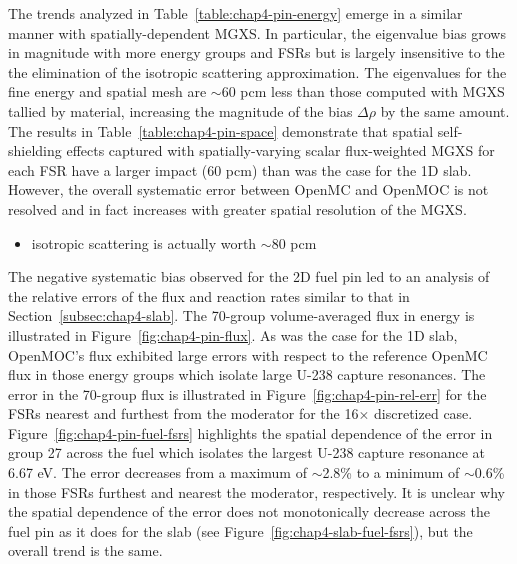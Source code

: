 The trends analyzed in Table~\ref{table:chap4-pin-energy} emerge in a similar manner with spatially-dependent \ac{MGXS}. In particular, the eigenvalue bias grows in magnitude with more energy groups and \ac{FSR}s but is largely insensitive to the the elimination of the isotropic scattering approximation. The eigenvalues for the fine energy and spatial mesh are $\sim$60 pcm less than those computed with \ac{MGXS} tallied by material, increasing the magnitude of the bias $\Delta\rho$ by the same amount. The results in Table~\ref{table:chap4-pin-space} demonstrate that spatial self-shielding effects captured with spatially-varying scalar flux-weighted \ac{MGXS} for each \ac{FSR} have a larger impact (60 pcm) than was the case for the 1D slab. However, the overall systematic error between OpenMC and OpenMOC is not resolved and in fact increases with greater spatial resolution of the \ac{MGXS}.

\begin{itemize}[noitemsep]
\item isotropic scattering is actually worth $\sim$80 pcm
\end{itemize}

The negative systematic bias observed for the 2D fuel pin led to an analysis of the relative errors of the flux and reaction rates similar to that in Section~\ref{subsec:chap4-slab}. The 70-group volume-averaged flux in energy is illustrated in Figure~\ref{fig:chap4-pin-flux}. As was the case for the 1D slab, OpenMOC's flux exhibited large errors with respect to the reference OpenMC flux in those energy groups which isolate large U-238 capture resonances. The error in the 70-group flux is illustrated in Figure~\ref{fig:chap4-pin-rel-err} for the \ac{FSR}s nearest and furthest from the moderator for the 16$\times$ discretized case. Figure~\ref{fig:chap4-pin-fuel-fsrs} highlights the spatial dependence of the error in group 27 across the fuel which isolates the largest U-238 capture resonance at 6.67 eV. The error decreases from a maximum of $\sim$2.8\% to a minimum of $\sim$0.6\% in those \ac{FSR}s furthest and nearest the moderator, respectively. It is unclear why the spatial dependence of the error does not monotonically decrease across the fuel pin as it does for the slab (see Figure~\ref{fig:chap4-slab-fuel-fsrs}), but the overall trend is the same.

